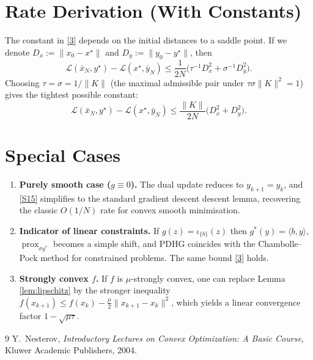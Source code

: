 \documentclass{article}
\newcommand{\prox}{\operatorname{prox}}
\begin{document}
\section*{Rate Derivation (With Constants)}
The constant in \eqref{3} depends on the initial distances to a saddle point.
If we denote $D_{x}:=\|x_{0}-x^{\star}\|$ and $D_{y}:=\|y_{0}-y^{\star}\|$, then
\[
\mathcal{L}(\bar x_{N},y^{\star})-\mathcal{L}(x^{\star},\bar y_{N})
\le \frac{1}{2N}\bigl(\tau^{-1}D_{x}^{2}+\sigma^{-1}D_{y}^{2}\bigr).
\]
Choosing $\tau=\sigma=1/\|K\|$ (the maximal admissible pair under $\tau\sigma\|K\|^{2}=1$) gives the tightest possible constant:
\[
\mathcal{L}(\bar x_{N},y^{\star})-\mathcal{L}(x^{\star},\bar y_{N})
\le \frac{\|K\|}{2N}\bigl(D_{x}^{2}+D_{y}^{2}\bigr).
\]

\section*{Special Cases}
\begin{enumerate}
\item \textbf{Purely smooth case ($g\equiv0$).}
The dual update reduces to $y_{k+1}=y_{k}$, and \eqref{S15} simplifies to the standard gradient descent descent lemma, recovering the classic $O(1/N)$ rate for convex smooth minimisation.
\item \textbf{Indicator of linear constraints.}
If $g(z)=\iota_{\{b\}}(z)$ then $g^{*}(y)=\langle b,y\rangle$, $\prox_{\sigma g^{*}}$ becomes a simple shift, and PDHG coincides with the Chambolle–Pock method for constrained problems. The same bound \eqref{3} holds.
\item \textbf{Strongly convex $f$.}
If $f$ is $\mu$‑strongly convex, one can replace Lemma \ref{lem:lipschitz} by the stronger inequality
$f(x_{k+1})\le f(x_{k})-\frac{\mu}{2}\|x_{k+1}-x_{k}\|^{2}$,
which yields a linear convergence factor $1-\sqrt{\mu\tau}$.
\end{enumerate}

\begin{thebibliography}{9}
Y.~Nesterov, \emph{Introductory Lectures on Convex Optimization: A Basic Course}, Kluwer Academic Publishers, 2004.
\end{thebibliography}
\end{document}

